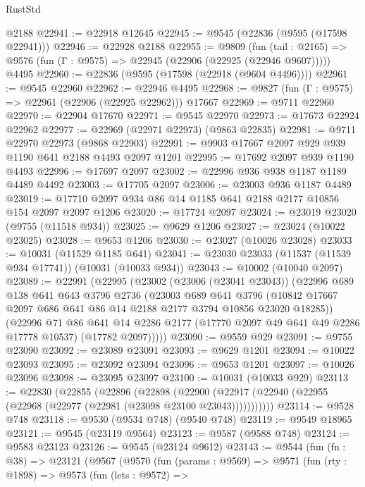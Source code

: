 \begin{lexlean}{RustStd}
\begin{coremodule}
    @2188
@22941 := @22918 @12645
@22945 := @9545 (@22836 (@9595 (@17598 @22941)))
@22946 := @22928 @2188
@22955 := @9809
    (fun (tail : @2165) => @9576 (fun (Γ : @9575) => @22945 (@22906 (@22925 (@22946 @9607)))))
    @4495
@22960 := @22836 (@9595 (@17598 (@22918 (@9604 @4496))))
@22961 := @9545 @22960
@22962 := @22946 @4495
@22968 := @9827 (fun (Γ : @9575) => @22961 (@22906 (@22925 @22962))) @17667
@22969 := @9711 @22960
@22970 := @22904 @17670
@22971 := @9545 @22970
@22973 := @17673 @22924 @22962
@22977 := @22969 (@22971 @22973) (@9863 @22835)
@22981 := @9711 @22970 @22973 (@9868 @22903)
@22991 := @9903 @17667 @2097 @929 @939 @1190 @641 @2188 @4493 @2097 @1201
@22995 := @17692 @2097 @939 @1190 @4493
@22996 := @17697 @2097
@23002 := @22996 @936 @938 @1187 @1189 @4489 @4492
@23003 := @17705 @2097
@23006 := @23003 @936 @1187 @4489
@23019 := @17710 @2097 @934 @86 @14 @1185 @641 @2188 @2177 @10856 @154 @2097 @2097 @1206
@23020 := @17724 @2097
@23024 := @23019 @23020 (@9755 (@11518 @934))
@23025 := @9629 @1206
@23027 := @23024 (@10022 @23025)
@23028 := @9653 @1206
@23030 := @23027 (@10026 @23028)
@23033 := @10031 (@11529 @1185 @641)
@23041 := @23030 @23033 (@11537 (@11539 @934 @17741)) (@10031 (@10033 @934))
@23043 := @10002 (@10040 @2097)
@23089 := @22991
    (@22995
      (@23002
        (@23006 (@23041 @23043))
        (@22996
          @689
          @138
          @641
          @643
          @3796
          @2736
          (@23003
            @689
            @641
            @3796
            (@10842 @17667 @2097 @686 @641 @86 @14 @2188 @2177 @3794 @10856 @23020 @18285))
          (@22996
            @71
            @86
            @641
            @14
            @2286
            @2177
            (@17770 @2097 @49 @641 @49 @2286 @17778 @10537)
            (@17782 @2097)))))
@23090 := @9559 @929
@23091 := @9755 @23090
@23092 := @23089 @23091
@23093 := @9629 @1201
@23094 := @10022 @23093
@23095 := @23092 @23094
@23096 := @9653 @1201
@23097 := @10026 @23096
@23098 := @23095 @23097
@23100 := @10031 (@10033 @929)
@23113 := @22830
    (@22855
      (@22896
        (@22898
          (@22900 (@22917 (@22940 (@22955 (@22968 (@22977 (@22981 (@23098 @23100 @23043)))))))))))
@23114 := @9528 @748
@23118 := @9530 (@9534 @748) (@9540 @748)
@23119 := @9549 @18965
@23121 := @9545 (@23119 @9564)
@23123 := @9587 (@9588 @748)
@23124 := @9583 @23123
@23126 := @9545 (@23124 @9612)
@23143 := @9544
    (fun (fn : @38) =>
    @23121
      (@9567
        (@9570
          (fun (params : @9569) =>
          @9571
            (fun (rty : @1898) =>
            @9573
              (fun (lets : @9572) =>

\end{coremodule}
\end{lexlean}
